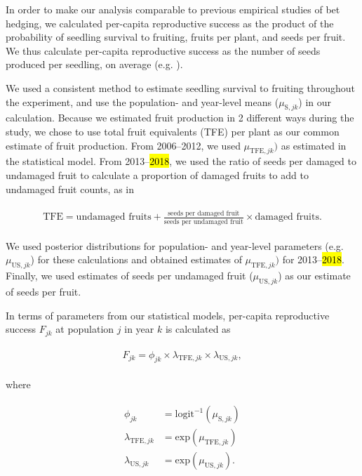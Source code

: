 \documentclass[12pt, oneside, titlepage]{article}   	%
\begin{document}
{In order to make our analysis comparable to previous empirical studies of bet hedging, we calculated per-capita reproductive success as the product of the probability of seedling survival to fruiting, fruits per plant, and seeds per fruit. We thus calculate per-capita reproductive success as the number of seeds produced per seedling, on average (e.g. \cite{venable2007,gremer2014}). 

We used a consistent method to estimate seedling survival to fruiting throughout the experiment, and use the population- and year-level means ($\mu_{\mathrm{S},jk}$) in our calculation. Because we estimated fruit production in 2 different ways during the study, we chose to use total fruit equivalents (TFE) per plant as our common estimate of fruit production. From 2006--2012, we used $\mu_{\mathrm{TFE},jk})$ as estimated in the statistical model. From 2013--\hl{2018}, we used the ratio of seeds per damaged to undamaged fruit to calculate a proportion of damaged fruits to add to undamaged fruit counts, as in 

\begin{align}
\begin{split}
\textrm{TFE} = \textrm{undamaged fruits} + \frac{\textrm{seeds per damaged fruit}}{\textrm{seeds per undamaged fruit}}\times  \textrm{damaged fruits} .
  \end{split}
\end{align}

We used posterior distributions for population- and year-level parameters (e.g. $\mu_{\mathrm{US},jk}$) for these calculations and obtained estimates of $\mu_{\mathrm{TFE},jk})$ for 2013--\hl{2018}. Finally, we used estimates of seeds per undamaged fruit ($\mu_{\mathrm{US},jk}$) as our estimate of seeds per fruit.

In terms of parameters from our statistical models, per-capita reproductive success $F_{jk}$ at population $j$ in year $k$ is calculated as

\begin{align}
  \begin{split}
F_{jk} = \phi_{jk} \times \lambda_{\mathrm{TFE},jk} \times \lambda_{\mathrm{US},jk}, \label{eq:percapitars}
  \end{split}
\end{align}

where

\begin{align}
  \begin{split}
\phi_{jk} & = \mathrm{logit}^{-1}(\mu_{\mathrm{S},jk}) \\
\lambda_{\mathrm{TFE},jk} & = \mathrm{exp}(\mu_{\mathrm{TFE},jk}) \\
\lambda_{\mathrm{US},jk} & = \mathrm{exp}(\mu_{\mathrm{US},jk}). 
  \end{split}
\end{align}

}
\end{document}
